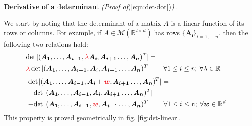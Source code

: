\documentclass[../../main.tex]{subfiles}
\begin{document}
\begin{expl}\textbf{Derivative of a determinant} \textit{(Proof of}(\ref{eqn:det-dot})\textit{)}  . \label{proof:det-dot} 

    We start by noting that the determinant of a matrix $A$ is a linear function of its rows or columns. For example, if $A \in \mathcal{M}(\mathbb{R}^{d \times d})$ has rows $\{\bm{A_i}\}_{i=1,\dots,n}$, then the following two relations hold:
    \begin{align} \label{eqn:prop1}
        \operatorname{det}|(\bm{A_1},\dots,\bm{A_{i-1}}, \textcolor{Red}{\lambda}\bm{A_i}, \bm{A_{i+1}}\dots, \bm{A_n})^T| = \\ \nonumber
       \textcolor{Red}{\lambda} \operatorname{det} | (\bm{A_1},\dots,\bm{A_{i-1}}, \bm{A_i} , \bm{A_{i+1}}\dots, \bm{A_n})^T| \qquad \forall 1 \leq i \leq n; \> \forall \lambda \in \mathbb{R} \span
    \end{align}
    \begin{align} \label{eqn:prop2}
       &\operatorname{det}|(\bm{A_1},\dots,\bm{A_{i-1}}, \bm{A_i} + \textcolor{Red}{\bm{w}}, \bm{A_{i+1}}\dots, \bm{A_n})^T| = \\ \nonumber
       &\hphantom{+}\operatorname{det} | (\bm{A_1},\dots,\bm{A_{i-1}}, \bm{A_i} , \bm{A_{i+1}}\dots, \bm{A_n})^T| +\\ \nonumber
       &\operatorname{+det} | (\bm{A_1},\dots,\bm{A_{i-1}}, \textcolor{Red}{\bm{w}}, \bm{A_{i+1}}\dots, \bm{A_n})^T|
       \qquad \forall 1 \leq i \leq n; \> \forall \bm{w} \in \mathbb{R}^d 
    \end{align}
    This property is proved geometrically in fig. \ref{fig:det-linear}.

    \medskip


\end{expl}
\end{document}
